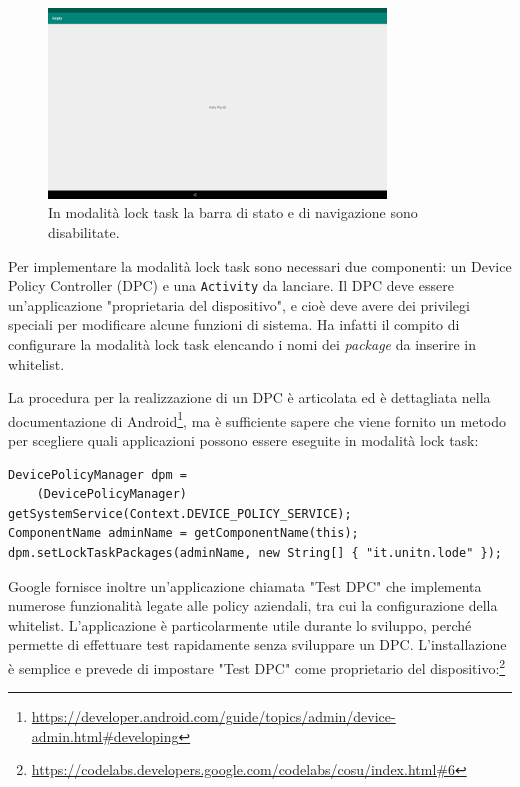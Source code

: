 \begin{figure}[h]
	\centering
	\includegraphics[width=0.8\textwidth]{res/locktask.png}
	
	\caption{In modalità lock task la barra di stato e di navigazione sono disabilitate.}
	\label{fig:kiosk_locktask}
\end{figure}

Per implementare la modalità lock task sono necessari due componenti: un Device Policy Controller (DPC) e una \texttt{Activity} da lanciare. Il DPC deve essere un'applicazione "proprietaria del dispositivo", e cioè deve avere dei privilegi speciali per modificare alcune funzioni di sistema. Ha infatti il compito di configurare la modalità lock task elencando i nomi dei \emph{package} da inserire in whitelist.

La procedura per la realizzazione di un DPC è articolata ed è dettagliata nella documentazione di Android\footnote{\url{https://developer.android.com/guide/topics/admin/device-admin.html\#developing}}, ma è sufficiente sapere che viene fornito un metodo per scegliere quali applicazioni possono essere eseguite in modalità lock task:

\begin{verbatim}
DevicePolicyManager dpm =
    (DevicePolicyManager) getSystemService(Context.DEVICE_POLICY_SERVICE);
ComponentName adminName = getComponentName(this);
dpm.setLockTaskPackages(adminName, new String[] { "it.unitn.lode" });
\end{verbatim}

Google fornisce inoltre un'applicazione chiamata "Test DPC" che implementa numerose funzionalità legate alle policy aziendali, tra cui la configurazione della whitelist. L'applicazione è particolarmente utile durante lo sviluppo, perché permette di effettuare test rapidamente senza sviluppare un DPC. L'installazione è semplice e prevede di impostare "Test DPC" come proprietario del dispositivo:\footnote{\url{https://codelabs.developers.google.com/codelabs/cosu/index.html\#6}}

